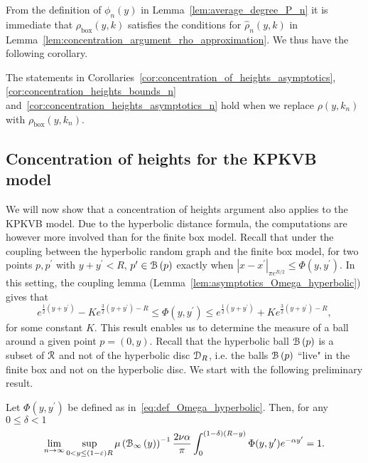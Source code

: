 From the definition of $\phi_n(y)$ in Lemma~\ref{lem:average_degree_P_n} it is immediate that $\rho_{\mathrm{box}}(y,k)$ satisfies the conditions for $\hat{\rho}_n(y,k)$ in Lemma~\ref{lem:concentration_argument_rho_approximation}. We thus have the following corollary.

\begin{corollary}\label{cor:concentration_of_heights_Gbox}
The statements in Corollaries~\ref{cor:concentration_of_heights_asymptotics}, \ref{cor:concentration_heights_bounds_n}
and~\ref{cor:concentration_heights_asymptotics_n} hold when we replace $\rho(y,k_n)$ with $\rho_{\text{box}}(y,k_n)$.
\end{corollary}

\subsection{Concentration of heights for the KPKVB model}\label{ssec:average_degree_HP_n}


We will now show that a concentration of heights argument also applies to the KPKVB model. Due to the hyperbolic distance formula, the computations are however more involved than for the finite box model. Recall that under the coupling between the hyperbolic random graph and the finite box model, for two points $p, p^\prime$ with $y + y^\prime < R$, $p^\prime \in {\mathcal B}\left(p\right)$ exactly when $|x-x^\prime|_{\pi e^{R/2}} \le \Phi(y,y^\prime)$. In this setting, the coupling lemma (Lemma~\ref{lem:asymptotics_Omega_hyperbolic}) gives that  
\[
	e^{\frac{1}{2}(y+y^\prime)} - K e^{\frac{3}{2}(y+y^\prime) - R} \leq \Phi(y, y^\prime) 
		\leq  e^{\frac{1}{2}(y+y^\prime)} + K e^{\frac{3}{2}(y+y^\prime) - R},
\]
for some constant $K$. This result enables us to determine the measure of a ball around a given point $p=(0,y)$. Recall that the hyperbolic ball ${\mathcal B}\left(p\right)$ is a subset of ${\mathcal R}$ and not of the hyperbolic disc ${\mathcal D}_{R}$, i.e. the balls ${\mathcal B}\left(p\right)$ ``live" in the finite box and not on the hyperbolic disc. We start with the following preliminary result.

\begin{lemma}\label{lem:hyperbolic_ball_lower_part}
Let $\Phi(y,y^\prime)$ be defined as in~\eqref{eq:def_Omega_hyperbolic}. Then, for any $0 \le \delta < 1$
\[
	\lim_{n \to \infty} \sup_{0 < y \le (1-\varepsilon)R} \mu\left({\mathcal B}_{\infty}\left(y\right)\right)^{-1} \frac{2\nu \alpha}{\pi} \int_0^{(1-\delta)(R-y)} \Phi(y,y^\prime) e^{-\alpha y^\prime} = 1.
\]
\end{lemma}

